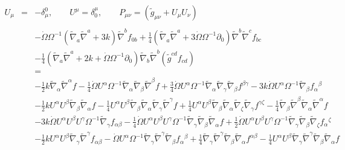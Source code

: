 \documentclass[10pt,letterpaper]{article}
\numberwithin{equation}{section}
\begin{document}
\begin{eqnarray}
U_\mu &=& -\delta_\mu^0,\qquad U^\mu = \delta^\mu_0,\qquad P_{\mu\nu} = (\tilde g_{\mu\nu} + U_{\mu}U_{\nu})
\\ \nonumber\\
&&
-\dot\Omega \Omega^{-1}(\tilde\nabla_a\tilde\nabla^a + 3k)\tilde\nabla^b f_{0b}
+\tfrac14 (\tilde\nabla_a\tilde\nabla^a+3\dot\Omega \Omega^{-1}\partial_0)\tilde\nabla^b\tilde\nabla^c f_{bc}
\nonumber\\
&& -\tfrac14 (\tilde\nabla_a\tilde\nabla^a +2k + \dot\Omega \Omega^{-1} \partial_0)\tilde\nabla_b\tilde\nabla^b (\tilde g^{cd}f_{cd})
\nonumber\\
&&=
\nonumber\\
&& - \tfrac{1}{2} k \tilde{\nabla}_{\alpha }\tilde{\nabla}^{\alpha }f -  \tfrac{1}{4} \dot{\Omega} U^{\alpha } \Omega^{-1} \tilde{\nabla}_{\alpha }\tilde{\nabla}_{\beta }\tilde{\nabla}^{\beta }f + \tfrac{3}{4} \dot{\Omega} U^{\alpha } \Omega^{-1} \tilde{\nabla}_{\alpha }\tilde{\nabla}_{\gamma }\tilde{\nabla}_{\beta }f^{\beta \gamma } - 3 k \dot{\Omega} U^{\alpha } \Omega^{-1} \tilde{\nabla}_{\beta }f_{\alpha }{}^{\beta } \nonumber \\ 
&& -  \tfrac{1}{2} k U^{\alpha } U^{\beta } \tilde{\nabla}_{\beta }\tilde{\nabla}_{\alpha }f -  \tfrac{1}{4} U^{\alpha } U^{\beta } \tilde{\nabla}_{\beta }\tilde{\nabla}_{\alpha }\tilde{\nabla}_{\gamma }\tilde{\nabla}^{\gamma }f + \tfrac{1}{4} U^{\alpha } U^{\beta } \tilde{\nabla}_{\beta }\tilde{\nabla}_{\alpha }\tilde{\nabla}_{\zeta }\tilde{\nabla}_{\gamma }f^{\gamma \zeta } -  \tfrac{1}{4} \tilde{\nabla}_{\beta }\tilde{\nabla}^{\beta }\tilde{\nabla}_{\alpha }\tilde{\nabla}^{\alpha }f \nonumber \\ 
&& - 3 k \dot{\Omega} U^{\alpha } U^{\beta } U^{\gamma } \Omega^{-1} \tilde{\nabla}_{\gamma }f_{\alpha \beta } -  \tfrac{1}{4} \dot{\Omega} U^{\alpha } U^{\beta } U^{\gamma } \Omega^{-1} \tilde{\nabla}_{\gamma }\tilde{\nabla}_{\beta }\tilde{\nabla}_{\alpha }f + \tfrac{1}{2} \dot{\Omega} U^{\alpha } U^{\beta } U^{\gamma } \Omega^{-1} \tilde{\nabla}_{\gamma }\tilde{\nabla}_{\beta }\tilde{\nabla}_{\zeta }f_{\alpha }{}^{\zeta } \nonumber \\ 
&& -  \tfrac{1}{2} k U^{\alpha } U^{\beta } \tilde{\nabla}_{\gamma }\tilde{\nabla}^{\gamma }f_{\alpha \beta } -  \dot{\Omega} U^{\alpha } \Omega^{-1} \tilde{\nabla}_{\gamma }\tilde{\nabla}^{\gamma }\tilde{\nabla}_{\beta }f_{\alpha }{}^{\beta } + \tfrac{1}{4} \tilde{\nabla}_{\gamma }\tilde{\nabla}^{\gamma }\tilde{\nabla}_{\beta }\tilde{\nabla}_{\alpha }f^{\alpha \beta } -  \tfrac{1}{4} U^{\alpha } U^{\beta } \tilde{\nabla}_{\gamma }\tilde{\nabla}^{\gamma }\tilde{\nabla}_{\beta }\tilde{\nabla}_{\alpha }f \nonumber \\ 

\end{eqnarray}
\end{document}

